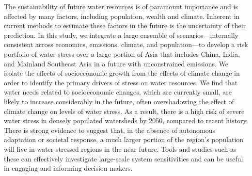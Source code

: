 The sustainability of future water resources is of paramount importance and is affected by many factors, including population, wealth and climate. Inherent in current methods to estimate these factors in the future is the uncertainty of their prediction. In this study, we integrate a large ensemble of scenarios—internally consistent across economics, emissions, climate, and population—to develop a risk portfolio of water stress over a large portion of Asia that includes China, India, and Mainland Southeast Asia in a future with unconstrained emissions. We isolate the effects of socioeconomic growth from the effects of climate change in order to identify the primary drivers of stress on water resources. We find that water needs related to socioeconomic changes, which are currently small, are likely to increase considerably in the future, often overshadowing the effect of climate change on levels of water stress. As a result, there is a high risk of severe water stress in densely populated watersheds by 2050, compared to recent history. There is strong evidence to suggest that, in the absence of autonomous adaptation or societal response, a much larger portion of the region’s population will live in water-stressed regions in the near future. Tools and studies such as these can effectively investigate large-scale system sensitivities and can be useful in engaging and informing decision makers.